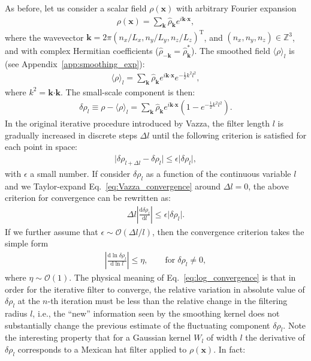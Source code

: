 \documentclass[]{article}
\newcommand{\bcdot}{\bm{\cdot}}
\begin{document}
As before, let us consider a scalar field $\rho (\bm x)$ with arbitrary Fourier expansion
%
\begin{align}\label{eq:def_rho_scalar}
	\rho (\bm x) = \sum_{\bm k} \hat{\rho}_{\bm k} e^{i \bm k \bcdot\bm x } ,
\end{align}
%
where the wavevector $\bm k = 2 \pi \left(n_x/L_x, n_y/L_y, n_z/L_z \right)^\mathrm{T}$, and $\left(n_x, n_y, n_z \right) \in \mathbb{Z}^3$, and with complex Hermitian coefficients ($\hat{\rho}_{-\bm k} = \hat{\rho}_{\bm k}^*$). 
The smoothed field $\langle \rho \rangle_l$ is (see Appendix~\ref{app:smoothing_exp}):
%
\begin{align}
	\langle \rho \rangle_l = \sum_{\bm k} \hat{\rho}_{\bm k} e^{i \bm k \bcdot\bm x } e^{-\frac{1}{2} k^2 l^2},
\end{align}
%
where $k^2 = \bm k \bcdot\bm k$. The small-scale component is then:
%
\begin{align}
	\delta \rho_l \equiv \rho - \langle \rho \rangle_l = \sum_{\bm k} \hat{\rho}_{\bm k} e^{i \bm k \bcdot\bm x } \left(1 - e^{-\frac{1}{2} k^2 l^2} \right).
\end{align}
%
In the original iterative procedure introduced by Vazza, the filter length $l$ is gradually increased in discrete steps $\Delta l$ until the following criterion is satisfied for each point in space:
%
\begin{align}\label{eq:Vazza_convergence}
	\lvert \delta \rho_{l+\Delta l} - \delta \rho_l \rvert \leq \epsilon \lvert  \delta \rho_l \rvert,
\end{align}
%
with $\epsilon$ a small number. If consider $\delta \rho_l$ as a function of the continuous variable $l$ and we Taylor-expand Eq.~\eqref{eq:Vazza_convergence} around $\Delta l = 0$, the above criterion for convergence can be rewritten as:
%
\begin{align}
	\Delta l \left\lvert \frac{\mathrm{d} \delta \rho_l }{\mathrm{d} l} \right\rvert \leq \epsilon \lvert  \delta \rho_l \rvert.
\end{align}
%
If we further assume that $\epsilon \sim \mathcal{O} (\Delta l / l)$, then the convergence criterion takes the simple form
%
\begin{align}\label{eq:log_convergence}
	\left\lvert\frac{\mathrm{d} \ln \delta \rho_l}{\mathrm{d} \ln l} \right\rvert \leq \eta, \hspace{2em} \text{for} \; \delta \rho_l \neq 0,
\end{align}
%
where $\eta \sim \mathcal{O}(1)$. The physical meaning of Eq.~\eqref{eq:log_convergence} is that in order for the iterative filter to converge, the relative variation in absolute value of $\delta \rho_l$ at the $n$-th iteration must be less than the relative change in the filtering radius $l$, i.e., the ``new'' information seen by the smoothing kernel does not substantially change the previous estimate of the fluctuating component $\delta \rho_l$. Note the interesting property that for a Gaussian kernel $W_l$ of width $l$ the derivative of $\delta \rho_l$ corresponds to a Mexican hat filter applied to $\rho(\bm x)$. In fact:
\end{document}
